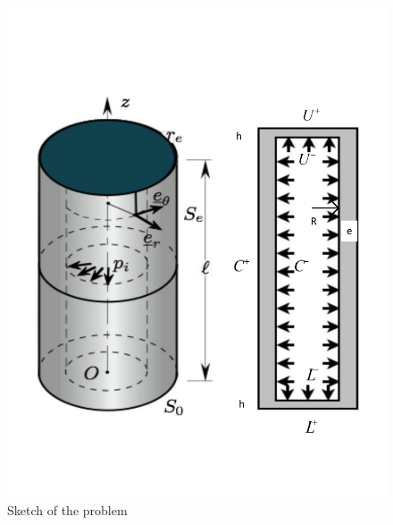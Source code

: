 \documentclass[letter,12pt]{article}
\begin{document}
%
\begin{figure}[!h]
	\centering
	\includegraphics[width=0.8\linewidth]{./volume}
	\caption{Sketch of the problem}
\end{figure}
%


 
 
 


 
\end{document}
